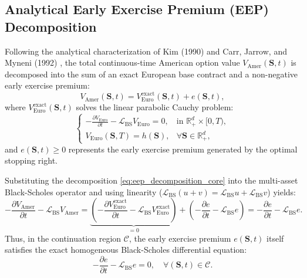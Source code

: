 \documentclass[11pt,a4paper]{article}
\begin{document}
\subsection{Analytical Early Exercise Premium (EEP) Decomposition}
Following the analytical characterization of Kim (1990) \cite{kim1990analytic} and Carr, Jarrow, and Myneni (1992) \cite{carr1992alternative}, the total continuous-time American option value $V_{\text{Amer}}(\mathbf{S}, t)$ is decomposed into the sum of an exact European base contract and a non-negative early exercise premium:
\begin{equation}
\label{eq:eep_decomposition_core}
V_{\text{Amer}}(\mathbf{S}, t) = V_{\text{Euro}}^{\text{exact}}(\mathbf{S}, t) + e(\mathbf{S}, t),
\end{equation}
where $V_{\text{Euro}}^{\text{exact}}(\mathbf{S}, t)$ solves the linear parabolic Cauchy problem:
\begin{equation}
\label{eq:euro_pde}
\begin{cases}
-\frac{\partial V_{\text{Euro}}}{\partial t} - \mathcal{L}_{\text{BS}} V_{\text{Euro}} = 0, & \text{in } \mathbb{R}_+^d \times [0, T), \\
V_{\text{Euro}}(\mathbf{S}, T) = h(\mathbf{S}), & \forall \mathbf{S} \in \mathbb{R}_+^d,
\end{cases}
\end{equation}
and $e(\mathbf{S}, t) \ge 0$ represents the early exercise premium generated by the optimal stopping right.

Substituting the decomposition \eqref{eq:eep_decomposition_core} into the multi-asset Black-Scholes operator and using linearity ($\mathcal{L}_{\text{BS}}(u + v) = \mathcal{L}_{\text{BS}} u + \mathcal{L}_{\text{BS}} v$) yields:
\begin{equation}
\label{eq:pde_linearity_split}
-\frac{\partial V_{\text{Amer}}}{\partial t} - \mathcal{L}_{\text{BS}} V_{\text{Amer}} = \underbrace{\left( -\frac{\partial V_{\text{Euro}}^{\text{exact}}}{\partial t} - \mathcal{L}_{\text{BS}} V_{\text{Euro}}^{\text{exact}} \right)}_{= 0} + \left( -\frac{\partial e}{\partial t} - \mathcal{L}_{\text{BS}} e \right) = -\frac{\partial e}{\partial t} - \mathcal{L}_{\text{BS}} e.
\end{equation}
Thus, in the continuation region $\mathcal{C}$, the early exercise premium $e(\mathbf{S}, t)$ itself satisfies the exact homogeneous Black-Scholes differential equation:
\begin{equation}
\label{eq:premium_pde}
-\frac{\partial e}{\partial t} - \mathcal{L}_{\text{BS}} e = 0, \quad \forall (\mathbf{S}, t) \in \mathcal{C}.
\end{equation}
\end{document}
